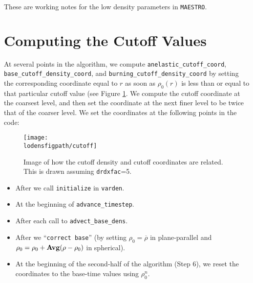 These are working notes for the low density parameters in {\tt MAESTRO}.

\section{Computing the Cutoff Values}

At several points in the algorithm, we compute {\tt anelastic\_cutoff\_coord}, 
{\tt base\_cutoff\_density\_coord}, and {\tt burning\_cutoff\_density\_coord} by 
setting the corresponding coordinate equal to $r$ as soon as $\rho_0(r)$ is less than 
or equal to that particular cutoff value (see Figure \ref{Fig:Cutoff}.
We compute the cutoff coordinate at the
coarsest level, and then set the coordinate at the next finer level to be twice that
of the coarser level.  We set the coordinates at the following points in the code:
\begin{figure}[hpb]
\centering
\texttt{[image: \\lodensfigpath/cutoff]}\hspace{0.2in}
\begin{minipage}[b]{5.0in}
\caption[Relation between cutoff density and cutoff coordinates]
{Image of how the cutoff density and cutoff coordinates
are related.  This is drawn assuming {\tt drdxfac}=5.\vspace{2em}}
\end{minipage}
\label{Fig:Cutoff}
\end{figure}

\begin{itemize}

\item After we call {\tt initialize} in {\tt varden}.

\item At the beginning of {\tt advance\_timestep}.

\item After each call to {\tt advect\_base\_dens}.

\item After we ``{\tt correct base}'' (by setting $\rho_0 = \overline{\rho}$ in
  plane-parallel and $\rho_0 = \rho_0 + {\bf{Avg}}(\rho - \rho_0)$ in spherical).

\item At the beginning of the second-half of the algorithm (Step 6), we reset
  the coordinates to the base-time values using $\rho_0^n$.

\end{itemize}

